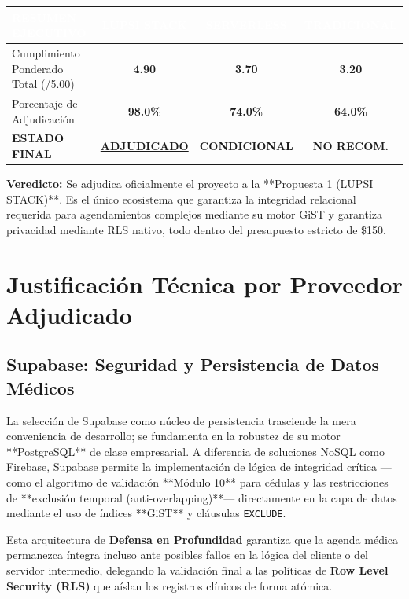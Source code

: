 \documentclass[a4paper,12pt]{article}
\renewcommand{\arraystretch}{1.1}
\begin{document}
\begin{table}[H]
\centering
\small
\renewcommand{\arraystretch}{1.8}
\begin{tabularx}{\linewidth}{|X|c|c|c|}
\hline
\rowcolor{SKTPrimary} \textcolor{white}{\textbf{RESUMEN EJECUTIVO}} & \textcolor{white}{\textbf{LUPSI STACK}} & \textcolor{white}{\textbf{SERVERLESS}} & \textcolor{white}{\textbf{TRADICIONAL}} \\ \hline
Cumplimiento Ponderado Total (/5.00) & \textbf{4.90} & \textbf{3.70} & \textbf{3.20} \\ \hline
Porcentaje de Adjudicación & \textbf{98.0\%} & \textbf{74.0\%} & \textbf{64.0\%} \\ \hline
\rowcolor{rowAwarded} \textbf{ESTADO FINAL} & \textbf{\underline{ADJUDICADO}} & \textbf{CONDICIONAL} & \textbf{NO RECOM.} \\ \hline
\end{tabularx}
\end{table}

\textbf{Veredicto:} Se adjudica oficialmente el proyecto a la **Propuesta 1 (LUPSI STACK)**. Es el único ecosistema que garantiza la integridad relacional requerida para agendamientos complejos mediante su motor GiST y garantiza privacidad mediante RLS nativo, todo dentro del presupuesto estricto de \$150.

\newpage
\section{Justificación Técnica por Proveedor Adjudicado}

\subsection{Supabase: Seguridad y Persistencia de Datos Médicos}
La selección de Supabase como núcleo de persistencia trasciende la mera conveniencia de desarrollo; se fundamenta en la robustez de su motor **PostgreSQL** de clase empresarial. A diferencia de soluciones NoSQL como Firebase, Supabase permite la implementación de lógica de integridad crítica —como el algoritmo de validación **Módulo 10** para cédulas y las restricciones de **exclusión temporal (anti-overlapping)**— directamente en la capa de datos mediante el uso de índices **GiST** y cláusulas \texttt{EXCLUDE}. 

Esta arquitectura de \textbf{Defensa en Profundidad} garantiza que la agenda médica permanezca íntegra incluso ante posibles fallos en la lógica del cliente o del servidor intermedio, delegando la validación final a las políticas de \textbf{Row Level Security (RLS)} que aíslan los registros clínicos de forma atómica.
\end{document}
